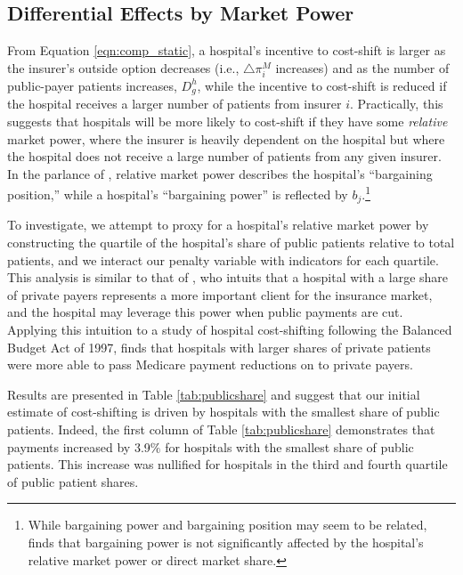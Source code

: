 \documentclass[12pt]{article}
\begin{document}
\subsection{Differential Effects by Market Power}
From Equation \ref{eqn:comp_static}, a hospital's incentive to cost-shift is larger as the insurer's outside option decreases (i.e., $\triangle \pi_{i}^{M}$ increases) and as the number of public-payer patients increases, $D_{g}^{h}$, while the incentive to cost-shift is reduced if the hospital receives a larger number of patients from insurer $i$. Practically, this suggests that hospitals will be more likely to cost-shift if they have some \textit{relative} market power, where the insurer is heavily dependent on the hospital but where the hospital does not receive a large number of patients from any given insurer. In the parlance of \cite{lewis2015}, relative market power describes the hospital's ``bargaining position,'' while a hospital's ``bargaining power'' is reflected by $b_{j}$.\footnote{While bargaining power and bargaining position may seem to be related, \cite{lewis2015} finds that bargaining power is not significantly affected by the hospital's relative market power or direct market share.}

To investigate, we attempt to proxy for a hospital's relative market power by constructing the quartile of the hospital's share of public patients relative to total patients, and we interact our penalty variable with indicators for each quartile. This analysis is similar to that of \cite{wu2010}, who intuits that a hospital with a large share of private payers represents a more important client for the insurance market, and the hospital may leverage this power when public payments are cut. Applying this intuition to a study of hospital cost-shifting following the Balanced Budget Act of 1997, \cite{wu2010} finds that hospitals with larger shares of private patients were more able to pass Medicare payment reductions on to private payers.

Results are presented in Table \ref{tab:publicshare} and suggest that our initial estimate of cost-shifting is driven by hospitals with the smallest share of public patients. Indeed, the first column of Table \ref{tab:publicshare} demonstrates that payments increased by 3.9$\%$ for hospitals with the smallest share of public patients. This increase was nullified for hospitals in the third and fourth quartile of public patient shares.
\end{document}

